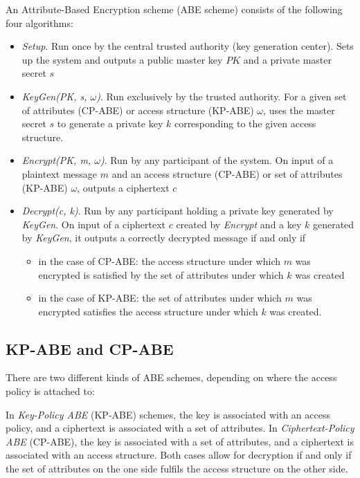 An Attribute-Based Encryption scheme (ABE scheme) consists of the following four algorithms: 
\begin{itemize}
    \item \emph{Setup}. Run once by the central trusted authority (key generation center). Sets up the system and outputs a public master key $PK$ and a private master secret $s$
    \item \emph{KeyGen(PK, s, $\omega$)}. Run exclusively by the trusted authority. For a given set of attributes (CP-ABE) or access structure (KP-ABE) $\omega$, uses the master secret $s$ to generate a private key $k$ corresponding to the given access structure.
    \item \emph{Encrypt(PK, m, $\omega$)}. Run by any participant of the system. On input of a plaintext message $m$ and an access structure (CP-ABE) or set of attributes (KP-ABE) $\omega$, outputs a ciphertext $c$
    \item \emph{Decrypt(c, k)}. Run by any participant holding a private key generated by \emph{KeyGen}. On input of a ciphertext $c$ created by \emph{Encrypt} and a key $k$ generated by \emph{KeyGen}, it outputs a correctly decrypted message if and only if
    \begin{itemize}
        \item in the case of CP-ABE: the access structure under which $m$ was encrypted is satisfied by the set of attributes under which $k$ was created
        \item in the case of KP-ABE: the set of attributes under which $m$ was encrypted satisfies the access structure under which $k$ was created.
    \end{itemize}
\end{itemize}

\subsection{KP-ABE and CP-ABE}
There are two different kinds of ABE schemes, depending on where the access policy is attached to:

In \emph{Key-Policy ABE} (KP-ABE) schemes, the key is associated with an access policy, and a ciphertext is associated with a set of attributes.
In \emph{Ciphertext-Policy ABE} (CP-ABE), the key is associated with a set of attributes, and a ciphertext is associated with an access structure.
Both cases allow for decryption if and only if the set of attributes on the one side fulfils the access structure on the other side.


